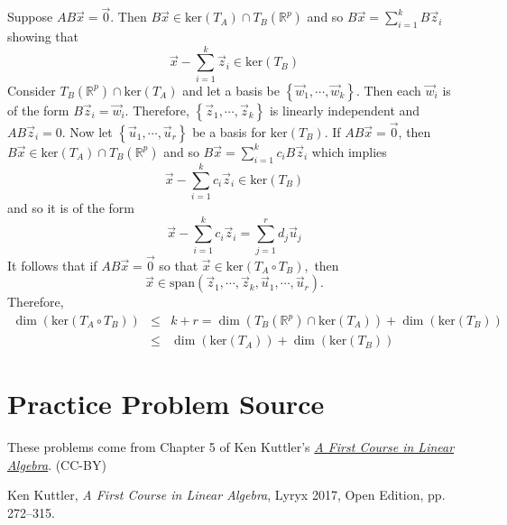 \documentclass{ximera}
\begin{document}
\begin{problem}
\begin{hint}
Suppose $AB\vec{x}=\vec{0}.$ Then $B\vec{x}\in \mbox{ker}
\left( T_A\right) \cap T_B\left( \mathbb{R}^{p}\right) $ and so $B\vec{x}
=\sum_{i=1}^{k}B\vec{z}_{i}$ showing that
\[
\vec{x}-\sum_{i=1}^{k}\vec{z}_{i}\in \mbox{ker} \left( T_B\right)
\]
Consider $T_B\left( \mathbb{R}^{p}\right) \cap \mbox{ker} \left( T_A\right) $ and let
a basis be $\left\{ \vec{w}_{1},\cdots ,\vec{w}_{k}\right\} .$ Then
each $\vec{w}_{i}$ is of the form $B\vec{z}_{i}=\vec{w}_{i}$.
Therefore, $\left\{ \vec{z}_{1},\cdots ,\vec{z}_{k}\right\} $ is
linearly independent and $AB\vec{z}_{i}=0.$ Now let $\left\{ \vec{u}
_{1},\cdots ,\vec{u}_{r}\right\} $ be a basis for $\mbox{ker} \left( T_B\right) .$
If $AB\vec{x}=\vec{0}$, then $B\vec{x} \in \mbox{ker} \left( T_A\right) \cap T_B\left(
\mathbb{R}^{p}\right) $ and so $B\vec{x}=\sum_{i=1}^{k}c_{i}B\vec{z}
_{i}$ which implies
\[
\vec{x}-\sum_{i=1}^{k}c_{i}\vec{z}_{i}\in \mbox{ker} \left( T_B\right)
\]
and so it is of the form
\[
\vec{x}-\sum_{i=1}^{k}c_{i}\vec{z}_{i}=\sum_{j=1}^{r}d_{j}\vec{u}
_{j}
\]
It follows that if $AB\vec{x}=\vec{0}$ so that $\vec{x}\in \mbox{ker} \left(
T_A\circ T_B\right) ,$ then
\[
\vec{x}\in \mbox{span}\left( \vec{z}_{1},\cdots ,\vec{z}_{k},
\vec{u}_{1},\cdots ,\vec{u}_{r}\right) .
\]
Therefore,
\begin{eqnarray*}
\dim \left( \mbox{ker} \left( T_A\circ T_B\right) \right)  &\leq &k+r=\dim \left( T_B\left(
\mathbb{R}^{p}\right) \cap \mbox{ker} \left( T_A\right) \right) +\dim \left( \mbox{ker}
\left( T_B\right) \right)  \\
&\leq &\dim \left( \mbox{ker} \left( T_A\right) \right) +\dim \left( \mbox{ker} \left(
T_B\right) \right)
\end{eqnarray*}
\end{hint}
\end{problem}


\section*{Practice Problem Source}
These problems come from Chapter 5 of Ken Kuttler's \href{https://open.umn.edu/opentextbooks/textbooks/a-first-course-in-linear-algebra-2017}{\it A First Course in Linear Algebra}. (CC-BY)

Ken Kuttler, {\it  A First Course in Linear Algebra}, Lyryx 2017, Open Edition, pp. 272--315.   
\end{document}
